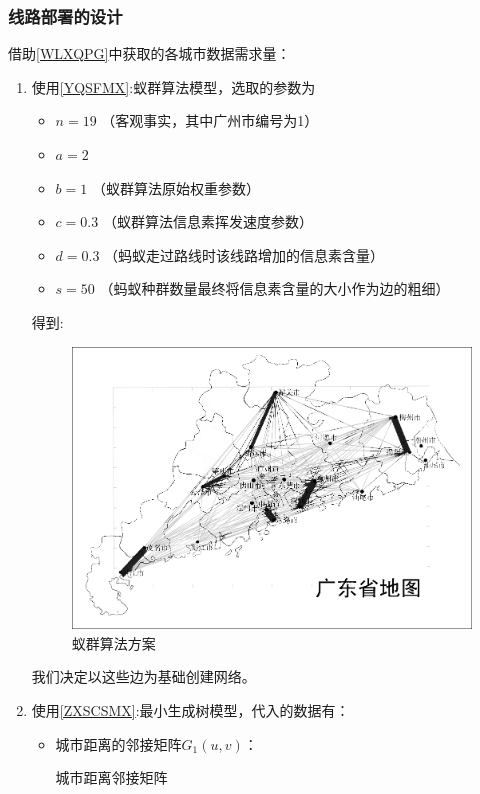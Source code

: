\documentclass[UTF8,12pt]{ctexart}
\begin{document}
        \subsubsection[线路部署位置]{线路部署的设计}    
            \noindent 借助\ref{WLXQPG}中获取的各城市数据需求量：
            \begin{enumerate}
                \item 使用\ref{YQSFMX}:蚁群算法模型，选取的参数为
                    \begin{itemize}
                        \item $n=19$ （客观事实，其中广州市编号为1）
                        \item $a=2$
                        \item $b=1$ （蚁群算法原始权重参数）
                        \item $c=0.3$ （蚁群算法信息素挥发速度参数）
                        \item $d=0.3$ （蚂蚁走过路线时该线路增加的信息素含量）
                        \item $s=50$ （蚂蚁种群数量最终将信息素含量的大小作为边的粗细）
                    \end{itemize}
                得到:
                    \begin{figure}[H]
                      \centering
                      \includegraphics[scale=0.28]{YQSF.png}   %
                      \caption{蚁群算法方案}
                      \end{figure}
                我们决定以这些边为基础创建网络。

                \item 使用\ref{ZXSCSMX}:最小生成树模型，代入的数据有：
                    \begin{itemize}
                        \item 城市距离的邻接矩阵$G_1(u,v)$：
            \begin{table}[H]
                \caption{城市距离邻接矩阵}
                \makebox[35em][c]{
                    \begin{scriptsize}
                        

\end{scriptsize}}
\end{table}
\end{itemize}
\end{enumerate}
\end{document}

